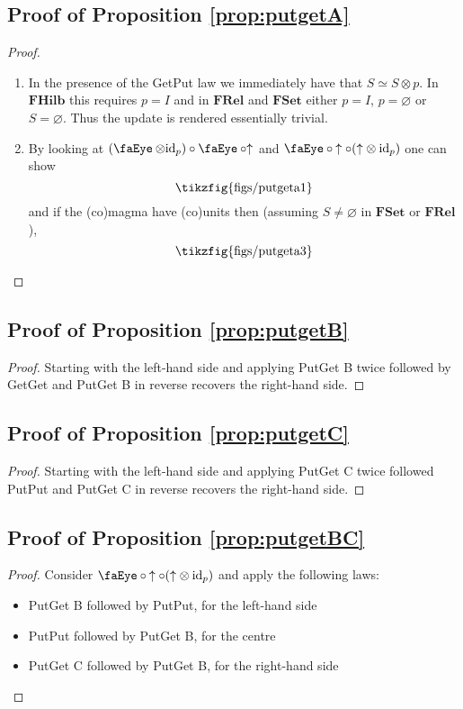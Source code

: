 \documentclass[submission,copyright,creativecommons,sharealike,noncommercial]{eptcs}
\newcommand{\tikzfigscale}[2]{\scalebox{#1}{\tikzfig{#2}}}
\newcommand{\id}[1]{\textrm{id}_{#1}}
\newcommand{\fhilb}{\textbf{FHilb}}
\newcommand{\frel}{\textbf{FRel}}
\newcommand{\fset}{\textbf{FSet}}
\newcommand{\putt}[1]{\mathbin{\uparrow_{#1}}}
\newcommand{\get}[1]{\operatorname{\text{\faEye}}_{#1}}
\theoremstyle{definition}
\theoremstyle{plain}
\theoremstyle{plain}
\begin{document}
\subsection{Proof of Proposition \ref{prop:putgetA}}\label{proof:putgetA}
\begin{proof}
\begin{enumerate}
\item In the presence of the GetPut law we immediately have that $S\simeq S\otimes p$. In $\fhilb$ this requires $p=I$ and in $\frel$ and $\fset$ either $p=I$, $p=\varnothing$ or $S=\varnothing$. Thus the update is rendered essentially trivial.
\item By looking at $(\get{}\otimes \id{p})\circ\get{}\circ \putt{}$ and $\get{}\circ\putt{}\circ(\putt{}\otimes\id{p})$ one can show
\begin{equation*}
    \tikzfigscale{1}{figs/putgeta1}
\end{equation*}
and if the (co)magma have (co)units then (assuming $S\neq \varnothing$ in $\fset$ or $\frel$), 
\begin{equation*}
    \tikzfigscale{1}{figs/putgeta3}
\end{equation*}
\end{enumerate}
\end{proof}

\subsection{Proof of Proposition \ref{prop:putgetB}}\label{proof:putgetB}
\begin{proof}
Starting with the left-hand side and applying PutGet B twice followed by GetGet and PutGet B in reverse recovers the right-hand side.
\end{proof}

\subsection{Proof of Proposition \ref{prop:putgetC}}\label{proof:putgetC}
\begin{proof}
Starting with the left-hand side and applying PutGet C twice followed PutPut and PutGet C in reverse recovers the right-hand side.
\end{proof}

\subsection{Proof of Proposition \ref{prop:putgetBC}}\label{proof:putgetBC}
\begin{proof}
Consider $\get{}\circ \putt{} \circ (\putt{}\otimes \id{p})$ and apply the following laws:
\begin{itemize}
\item PutGet B followed by PutPut, for the left-hand side
\item PutPut followed by PutGet B, for the centre
\item PutGet C followed by PutGet B, for the right-hand side
\end{itemize}
\end{proof}
\end{document}
